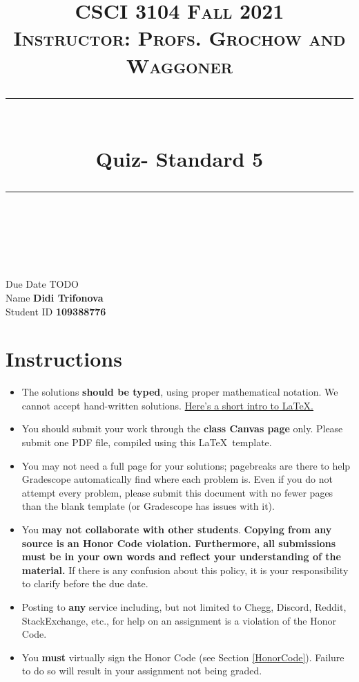 \documentclass[11pt]{article}
\title{
\normalfont \normalsize 
\textsc{CSCI 3104 Fall 2021 \\ 
Instructor: Profs. Grochow and Waggoner} \\
[10pt] 
\rule{\linewidth}{0.5pt} \\[6pt] 
\huge Quiz- Standard 5 \\
\rule{\linewidth}{2pt}  \\[10pt]
}
\date{}
\theoremstyle{definition}
\theoremstyle{definition}
\theoremstyle{definition}
\begin{document}
\maketitle


\noindent
Due Date \dotfill TODO \\
Name \dotfill \textbf{Didi Trifonova} \\
Student ID \dotfill \textbf{109388776} \\


\tableofcontents

\section{Instructions}
 \begin{itemize}
	\item The solutions \textbf{should be typed}, using proper mathematical notation. We cannot accept hand-written solutions. \href{http://ece.uprm.edu/~caceros/latex/introduction.pdf}{Here's a short intro to \LaTeX.}
	\item You should submit your work through the \textbf{class Canvas page} only. Please submit one PDF file, compiled using this \LaTeX \ template.
	\item You may not need a full page for your solutions; pagebreaks are there to help Gradescope automatically find where each problem is. Even if you do not attempt every problem, please submit this document with no fewer pages than the blank template (or Gradescope has issues with it).

	\item You \textbf{may not collaborate with other students}. \textbf{Copying from any source is an Honor Code violation. Furthermore, all submissions must be in your own words and reflect your understanding of the material.} If there is any confusion about this policy, it is your responsibility to clarify before the due date. 

	\item Posting to \textbf{any} service including, but not limited to Chegg, Discord, Reddit, StackExchange, etc., for help on an assignment is a violation of the Honor Code.

	\item You \textbf{must} virtually sign the Honor Code (see Section \ref{HonorCode}). Failure to do so will result in your assignment not being graded.
\end{itemize}
\end{document}
